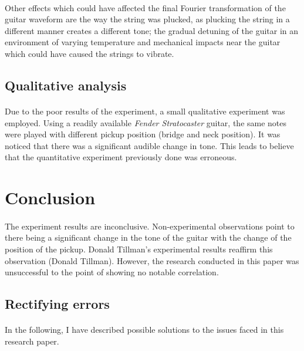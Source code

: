 \documentclass{article}
\begin{document}
\paragraph*{}
Other effects which could have affected the final Fourier transformation of 
the guitar waveform are the way the string was plucked, as plucking the string 
in a different manner creates a different tone; the gradual detuning of the 
guitar in an environment of varying temperature and mechanical impacts near 
the guitar which could have caused the strings to vibrate.

\subsection{Qualitative analysis}

\paragraph*{}
Due to the poor results of the experiment, a small qualitative experiment was
employed. Using a readily available \textit{Fender Stratocaster} guitar, the
same notes were played with different pickup position (bridge and neck
position). It was noticed that there was a significant audible change in tone.
This leads to believe that the quantitative experiment previously done was
erroneous.

\section{Conclusion}

\paragraph*{}
The experiment results are inconclusive. Non-experimental observations point to 
there being a significant change in the tone of the guitar with the change of 
the position of the pickup. Donald Tillman's experimental results reaffirm 
this observation (Donald Tillman). However, the research conducted in this 
paper was unsuccessful to the point of showing no notable correlation.

\subsection{Rectifying errors}

\paragraph*{}
In the following, I have described possible solutions to the issues faced in 
this research paper.
\end{document}
